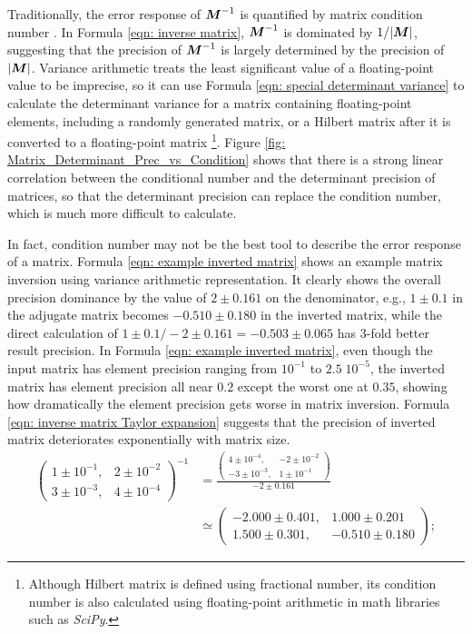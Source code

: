 \documentclass[twoside]{article}
\numberwithin{equation}{section}
\begin{document}
Traditionally, the error response of $\protect{\textrm{\boldmath $M$}}^{-1}$ is quantified by matrix condition number \cite{Linear_Algebra}.
In Formula \eqref{eqn: inverse matrix}, $\protect{\textrm{\boldmath $M$}}^{-1}$ is dominated by $1/|\protect{\textrm{\boldmath $M$}}|$, suggesting that the precision of $\protect{\textrm{\boldmath $M$}}^{-1}$ is largely determined by the precision of $|\protect{\textrm{\boldmath $M$}}|$.
Variance arithmetic treats the least significant value of a floating-point value to be imprecise, so it can use Formula \eqref{eqn: special determinant variance} to calculate the determinant variance for a matrix containing floating-point elements, including a randomly generated matrix, or a Hilbert matrix \cite{Linear_Algebra} after it is converted to a floating-point matrix \footnote{Although Hilbert matrix is defined using fractional number, its condition number is also calculated using floating-point arithmetic in math libraries such as \textit{SciPy}.}.
Figure \ref{fig: Matrix_Determinant_Prec_vs_Condition} shows that there is a strong linear correlation between the conditional number and the determinant precision of matrices, so that the determinant precision can replace the condition number, which is much more difficult to calculate.

In fact, condition number may not be the best tool to describe the error response of a matrix.
Formula \eqref{eqn: example inverted matrix} shows an example matrix inversion using variance arithmetic representation.
It clearly shows the overall precision dominance by the value of $2 \pm 0.161$ on the denominator, e.g., $1 \pm 0.1$ in the adjugate matrix becomes $-0.510 \pm 0.180$ in the inverted matrix, while the direct calculation of $1 \pm 0.1 / -2 \pm 0.161 = -0.503 \pm 0.065$ has $3$-fold better result precision.
In Formula \eqref{eqn: example inverted matrix}, even though the input matrix has element precision ranging from $10^{-1}$ to $2.5\;10^{-5}$, the inverted matrix has element precision all near $0.2$ except the worst one at $0.35$, showing how dramatically the element precision gets worse in matrix inversion.
Formula \eqref{eqn: inverse matrix Taylor expansion} suggests that the precision of inverted matrix deteriorates exponentially with matrix size.
\begin{align}
\label{eqn: example inverted matrix}
\left( \begin{matrix} 1 \pm 10^{-1}, & 2 \pm 10^{-2} \\ 3 \pm 10^{-3}, & 4 \pm 10^{-4} \end{matrix} \right)^{-1} &= 
\frac{ \left( \begin{matrix} 4 \pm 10^{-4}, & -2 \pm 10^{-2} \\ -3 \pm 10^{-3}, & 1 \pm 10^{-1} \end{matrix} \right) }{-2 \pm 0.161} \\
&\simeq \left( \begin{matrix} -2.000 \pm 0.401, & 1.000 \pm 0.201 \\ 1.500 \pm 0.301, & -0.510 \pm 0.180 \end{matrix} \right); \nonumber
\end{align}
\end{document}
